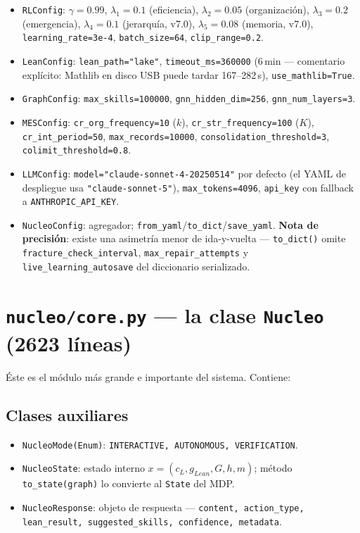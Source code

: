 \documentclass[11pt,a4paper]{report}
\newcommand{\code}[1]{\texttt{#1}}
\begin{document}
\begin{itemize}
  \item \code{RLConfig}: $\gamma=0.99$, $\lambda_1=0.1$ (eficiencia), $\lambda_2=0.05$ (organizaci\'on), $\lambda_3=0.2$ (emergencia), $\lambda_4=0.1$ (jerarqu\'ia, v7.0), $\lambda_5=0.08$ (memoria, v7.0), \code{learning_rate=3e-4}, \code{batch_size=64}, \code{clip_range=0.2}.
  \item \code{LeanConfig}: \code{lean_path="lake"}, \code{timeout_ms=360000} (6\,min --- comentario expl\'icito: Mathlib en disco USB puede tardar 167--282\,s), \code{use_mathlib=True}.
  \item \code{GraphConfig}: \code{max_skills=100000}, \code{gnn_hidden_dim=256}, \code{gnn_num_layers=3}.
  \item \code{MESConfig}: \code{cr_org_frequency=10} ($k$), \code{cr_str_frequency=100} ($K$), \code{cr_int_period=50}, \code{max_records=10000}, \code{consolidation_threshold=3}, \code{colimit_threshold=0.8}.
  \item \code{LLMConfig}: \code{model="claude-sonnet-4-20250514"} por defecto (el YAML de despliegue usa \code{"claude-sonnet-5"}), \code{max_tokens=4096}, \code{api_key} con fallback a \code{ANTHROPIC_API_KEY}.
  \item \code{NucleoConfig}: agregador; \code{from_yaml}/\code{to_dict}/\code{save_yaml}. \textbf{Nota de precisi\'on}: existe una asimetr\'ia menor de ida-y-vuelta --- \code{to_dict()} omite \code{fracture_check_interval}, \code{max_repair_attempts} y \code{live_learning_autosave} del diccionario serializado.
\end{itemize}

\section{\code{nucleo/core.py} --- la clase \code{Nucleo} (2623 l\'ineas)}

\'Este es el m\'odulo m\'as grande e importante del sistema. Contiene:

\subsection{Clases auxiliares}
\begin{itemize}
  \item \code{NucleoMode(Enum)}: \code{INTERACTIVE, AUTONOMOUS, VERIFICATION}.
  \item \code{NucleoState}: estado interno $x=(c_L,g_{Lean},G,h,m)$; m\'etodo \code{to_state(graph)} lo convierte al \code{State} del MDP.
  \item \code{NucleoResponse}: objeto de respuesta --- \code{content, action_type, lean_result, suggested_skills, confidence, metadata}.
\end{itemize}
\end{document}
